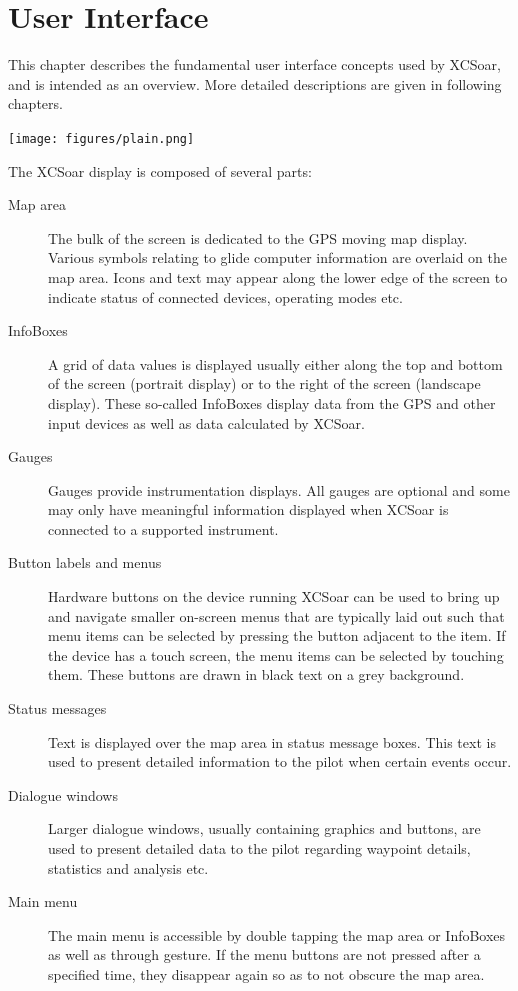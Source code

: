 \chapter{User Interface}\label{cha:interface}
This chapter describes the fundamental user interface concepts used by
XCSoar, and is intended as an overview.  More detailed descriptions
are given in following chapters.

\begin{center}
\texttt{[image: figures/plain.png]}
\end{center}

The XCSoar display is composed of several parts:
\begin{description}
\item[Map area] The bulk of the screen is dedicated to the GPS moving map
display. Various symbols relating to glide computer information are overlaid 
on the map area. Icons and text may appear along the lower edge of the screen
to indicate status of connected devices, operating modes etc.
\item[InfoBoxes] A grid of data values is displayed usually either along
the top and bottom of the screen (portrait display) or to the right of the
screen (landscape display).  These so-called InfoBoxes display data from the
GPS and other input devices as well as data calculated by XCSoar.
\item[Gauges]  Gauges provide instrumentation displays. All gauges are optional
and some may only have meaningful information displayed when XCSoar is
connected to a supported instrument.
\item[Button labels and menus] Hardware buttons on the device running XCSoar
can be used to bring up and navigate smaller on-screen menus that are
typically laid out such that menu items can be selected by pressing the
button adjacent to the item.  If the device has a touch screen, the menu
items can be selected by touching them.  These buttons are drawn in black
text on a grey background.
\item[Status messages] Text is displayed over the map area in status message
boxes.  This text is used to present detailed information to the pilot when
certain events occur.
\item[Dialogue windows] Larger dialogue windows, usually containing graphics and
buttons, are used to present detailed data to the pilot regarding waypoint
details, statistics and analysis etc.
\item[Main menu] The main menu is accessible by double tapping the map area or
InfoBoxes as well as through gesture. If the menu buttons are
not pressed after a specified time, they disappear again so as to not obscure the map area.
\end{description}

